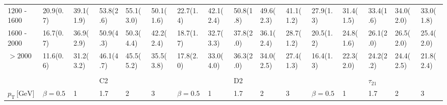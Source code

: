 \begin{table}
{\begin{tabular}{llllllllllllllll}
\multicolumn{1}{l||}{1200 - 1600} & \multicolumn{1}{l|}{20.9(0.7)} & \multicolumn{1}{l|}{39.1(1.9)} & \multicolumn{1}{l|}{53.8(2.6)} & 				     	\multicolumn{1}{l|}{\cellcolor{Red!50}55.1(3.0)} & 		\multicolumn{1}{l||}{50.1(1.6)} & \multicolumn{1}{l|}{22.7(1.4)} & \multicolumn{1}{l|}{42.1(2.4)} & 						\multicolumn{1}{l|}{50.8(1.8)} & 					\multicolumn{1}{l|}{49.6(2.3)} & 	\multicolumn{1}{l||}{41.1(1.2)} & 					\multicolumn{1}{l|}{27.9(1.3)} & 	\multicolumn{1}{l|}{31.4(1.5)} & \multicolumn{1}{l|}{33.4(1.6)} & \multicolumn{1}{l|}{34.0(2.0)} & \multicolumn{1}{l|}{33.0(1.8)} \\
\multicolumn{1}{l||}{1600 - 2000} & \multicolumn{1}{l|}{16.7(0.7)} & \multicolumn{1}{l|}{36.9(2.9)} & \multicolumn{1}{l|}{\cellcolor{Red!50}50.9(4.3)} &    \multicolumn{1}{l|}{50.3(4.4)} & 						\multicolumn{1}{l||}{42.2(2.4)} & \multicolumn{1}{l|}{18.7(1.7)} & \multicolumn{1}{l|}{32.7(3.3)} & 						\multicolumn{1}{l|}{37.8(2.0)} & 					\multicolumn{1}{l|}{36.1(2.4)} & 	\multicolumn{1}{l||}{28.7(1.2)} & 					\multicolumn{1}{l|}{20.5(1.2)} & 	\multicolumn{1}{l|}{24.8(1.6)} & \multicolumn{1}{l|}{26.1(2.0)} & \multicolumn{1}{l|}{26.5(2.0)} & \multicolumn{1}{l|}{25.4(2.0)} \\
\multicolumn{1}{l||}{$>2000$} & 	\multicolumn{1}{l|}{11.6(0.6)} & \multicolumn{1}{l|}{31.2(3.2)} & \multicolumn{1}{l|}{\cellcolor{Red!50}46.1(4.7)} &    \multicolumn{1}{l|}{45.5(5.2)} & 						\multicolumn{1}{l||}{35.5(3.8)} & \multicolumn{1}{l|}{17.8(2.0)} & \multicolumn{1}{l|}{33.0(4.0)} & 						\multicolumn{1}{l|}{36.3(2.0)} & 					\multicolumn{1}{l|}{34.0(2.5)} & 	\multicolumn{1}{l||}{27.4(1.3)} & 					\multicolumn{1}{l|}{16.4(1.3)} & 	\multicolumn{1}{l|}{22.3(2.0)} & \multicolumn{1}{l|}{24.2(2.2)} & \multicolumn{1}{l|}{24.4(2.5)} & \multicolumn{1}{l|}{21.8(2.4)} \\ \hline
 &  &  &  &  &  &  &  &  &  &  &  &  &  &  &  \\
\rowcolor{Gray} \multicolumn{1}{l||}{\textbf{Tracks}} &  &  & C2 &  & \multicolumn{1}{l||}{} &  &  & D2 &  & \multicolumn{1}{l||}{} &  &  & $\tau_{21}$ &  & \multicolumn{1}{l|}{} \\ \hline
\multicolumn{1}{l||}{$p_{\mathrm{T}} \, \text{[GeV]}$}  & \multicolumn{1}{l|}{\cellcolor{Gray2}$\beta=0.5$} & \multicolumn{1}{l|}{\cellcolor{Gray2}1} & \multicolumn{1}{l|}{\cellcolor{Gray2}1.7} & \multicolumn{1}{l|}{\cellcolor{Gray2}2} & \multicolumn{1}{l||}{\cellcolor{Gray2}3} & \multicolumn{1}{l|}{\cellcolor{Gray2}$\beta=0.5$} & \multicolumn{1}{l|}{\cellcolor{Gray2}1} & \multicolumn{1}{l|}{\cellcolor{Gray2}1.7} & \multicolumn{1}{l|}{\cellcolor{Gray2}2} & \multicolumn{1}{l||}{\cellcolor{Gray2}3} & \multicolumn{1}{l|}{\cellcolor{Gray2}$\beta=0.5$} & \multicolumn{1}{l|}{\cellcolor{Gray2}1} & \multicolumn{1}{l|}{\cellcolor{Gray2}1.7} & \multicolumn{1}{l|}{\cellcolor{Gray2}2} & \multicolumn{1}{l|}{\cellcolor{Gray2}3} \\ \hline \hline

\end{tabular}}
\end{table}
